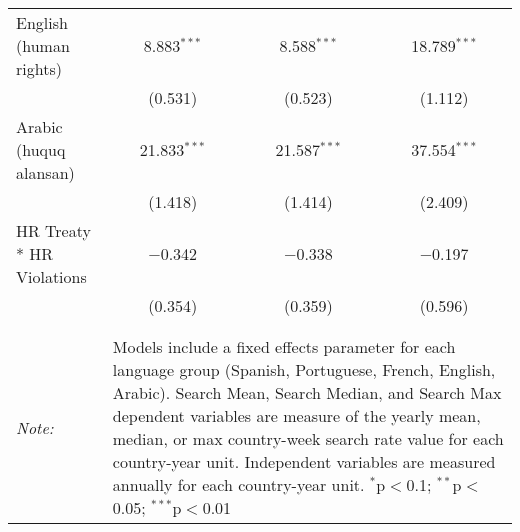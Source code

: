 \begin{table}[!htbp]
\begin{tabular}{@{\extracolsep{5pt}}lccc}
  English (human rights) & 8.883$^{***}$ & 8.588$^{***}$ & 18.789$^{***}$ \\ 
  & (0.531) & (0.523) & (1.112) \\ 
  Arabic (huquq alansan) & 21.833$^{***}$ & 21.587$^{***}$ & 37.554$^{***}$ \\ 
  & (1.418) & (1.414) & (2.409) \\ 
  HR Treaty * HR Violations & $-$0.342 & $-$0.338 & $-$0.197 \\ 
  & (0.354) & (0.359) & (0.596) \\ 
 \hline \\[-1.8ex] 
\hline 
\hline \\[-1.8ex] 
\textit{Note:}  & \multicolumn{3}{l}{\parbox[t]{8cm}{Models include a fixed effects parameter for each language group (Spanish, Portuguese, French, English, Arabic). Search Mean, Search Median, and Search Max dependent variables are measure of the yearly mean, median, or max country-week search rate value for each country-year unit. Independent variables are measured annually for each country-year unit. $^{*}$p$<$0.1; $^{**}$p$<$0.05; $^{***}$p$<$0.01}} \\ 
\end{tabular} 
\end{table} 

